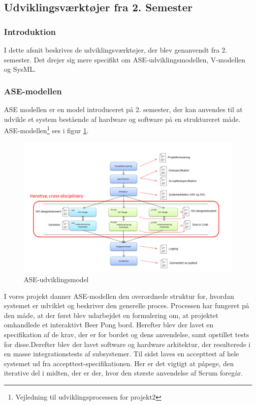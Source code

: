 \documentclass[a4paper,12pt,fleqn,oneside]{article}
\begin{document}
\subsection{Udviklingsværktøjer fra 2. Semester}
\subsubsection{Introduktion}
I dette afsnit beskrives de udviklingsværktøjer, der blev genanvendt fra 2. semester. Det drejer sig mere specifikt om ASE-udviklingsmodellen, V-modellen og SysML.
\subsubsection{ASE-modellen}
ASE modellen er en model introduceret på 2. semester, der kan anvendes til at udvikle et system bestående af hardware og software på en struktureret måde. ASE-modellen\footnote{Vejledning til udviklingsprocessen for projekt2} ses i figur \ref{fig:ASE_model}.
\begin{figure}[H]
    \centering
    \includegraphics[width=\textwidth]{Processdokument/graphics/ASE_model.png}
    \caption{ASE-udviklingsmodel}
    \label{fig:ASE_model}
\end{figure}
I vores projekt danner ASE-modellen den overordnede struktur for, hvordan systemet er udviklet og beskriver den generelle proces. Processen har fungeret på den måde, at der først blev udarbejdet en formulering om, at projektet omhandlede et interaktivt Beer Pong bord. Herefter blev der lavet en specifikation af de krav, der er for bordet og dens anvendelse, samt opstillet tests for disse.Derefter blev der lavet software og hardware arkitektur, der resulterede i en masse integrationstests af subsystemer. Til sidst laves en accepttest af hele systemet ud fra accepttest-specifikationen. Her er det vigtigt at påpege, den iterative del i midten, der er der, hvor den største anvendelse af Scrum foregår.
\end{document}
